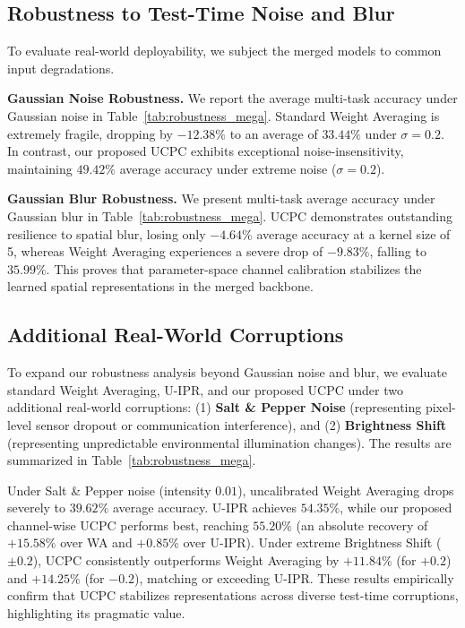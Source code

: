 \documentclass{article}
\theoremstyle{plain}
\theoremstyle{definition}
\theoremstyle{remark}
\begin{document}
\subsection{Robustness to Test-Time Noise and Blur}
To evaluate real-world deployability, we subject the merged models to common input degradations.

\textbf{Gaussian Noise Robustness.} We report the average multi-task accuracy under Gaussian noise in Table~\ref{tab:robustness_mega}. Standard Weight Averaging is extremely fragile, dropping by $-12.38\%$ to an average of $33.44\%$ under $\sigma=0.2$. In contrast, our proposed UCPC exhibits exceptional noise-insensitivity, maintaining $49.42\%$ average accuracy under extreme noise ($\sigma=0.2$).

\textbf{Gaussian Blur Robustness.} We present multi-task average accuracy under Gaussian blur in Table~\ref{tab:robustness_mega}. UCPC demonstrates outstanding resilience to spatial blur, losing only $-4.64\%$ average accuracy at a kernel size of 5, whereas Weight Averaging experiences a severe drop of $-9.83\%$, falling to $35.99\%$. This proves that parameter-space channel calibration stabilizes the learned spatial representations in the merged backbone.

\subsection{Additional Real-World Corruptions}
To expand our robustness analysis beyond Gaussian noise and blur, we evaluate standard Weight Averaging, U-IPR, and our proposed UCPC under two additional real-world corruptions: (1) \textbf{Salt \& Pepper Noise} (representing pixel-level sensor dropout or communication interference), and (2) \textbf{Brightness Shift} (representing unpredictable environmental illumination changes). The results are summarized in Table~\ref{tab:robustness_mega}.

Under Salt \& Pepper noise (intensity $0.01$), uncalibrated Weight Averaging drops severely to $39.62\%$ average accuracy. U-IPR achieves $54.35\%$, while our proposed channel-wise UCPC performs best, reaching $55.20\%$ (an absolute recovery of $+15.58\%$ over WA and $+0.85\%$ over U-IPR). Under extreme Brightness Shift ($\pm 0.2$), UCPC consistently outperforms Weight Averaging by $+11.84\%$ (for $+0.2$) and $+14.25\%$ (for $-0.2$), matching or exceeding U-IPR. These results empirically confirm that UCPC stabilizes representations across diverse test-time corruptions, highlighting its pragmatic value.
\end{document}

